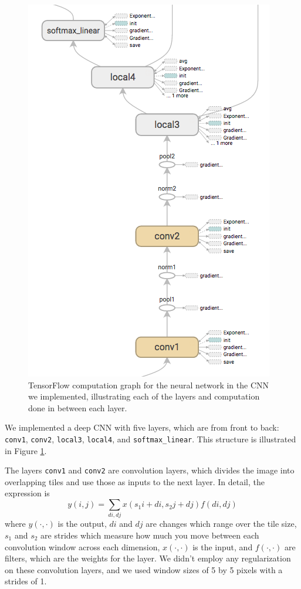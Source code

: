 \documentclass[10pt, twocolumn, twoside]{article}
\begin{document}
\begin{figure}[!htbp]
	\centering
	\includegraphics[width=\linewidth]{inference_graph}
	\caption{TensorFlow computation graph for the neural network in the CNN we implemented, illustrating each of the layers and computation done in between each layer.}
	\label{fig:inference}
\end{figure}

We implemented a deep CNN with five layers, which are from front to back: \texttt{conv1}, \texttt{conv2}, \texttt{local3}, \texttt{local4}, and \texttt{softmax\_linear}. This structure is illustrated in Figure \ref{fig:inference}. 

The layers \texttt{conv1} and \texttt{conv2} are convolution layers, which divides the image into overlapping tiles and use those as inputs to the next layer. In detail, the expression is
\[ y(i, j) = \sum_{di, dj} x(s_1i + di, s_2j + dj) f(di, dj)\]
where $y(\cdot, \cdot)$ is the output, $di$ and $dj$ are changes which range over the tile size, $s_1$ and $s_2$ are strides which measure how much you move between each convolution window across each dimension, $x(\cdot, \cdot)$ is the input, and $f(\cdot, \cdot)$ are filters, which are the weights for the layer. We didn't employ any regularization on these convolution layers, and we used window sizes of 5 by 5 pixels with a strides of 1.
\end{document}
